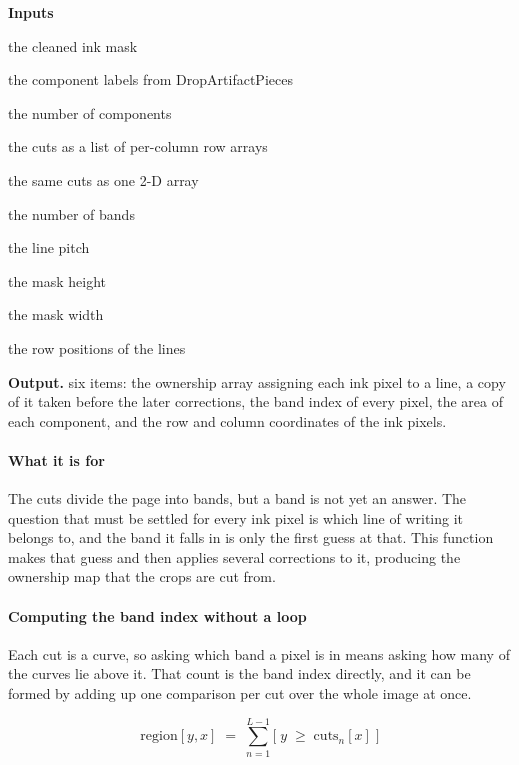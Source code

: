 \noindent\textbf{Inputs}
\begin{description}[leftmargin=2.2em,style=nextline,font=\normalfont\ttfamily]\setlength\itemsep{1pt}
  \item[{mask}] \normalfont the cleaned ink mask
  \item[{lab}] \normalfont the component labels from DropArtifactPieces
  \item[{nc}] \normalfont the number of components
  \item[{cuts}] \normalfont the cuts as a list of per-column row arrays
  \item[{cutsArr}] \normalfont the same cuts as one 2-D array
  \item[{L}] \normalfont the number of bands
  \item[{P}] \normalfont the line pitch
  \item[{H}] \normalfont the mask height
  \item[{W}] \normalfont the mask width
  \item[{centres}] \normalfont the row positions of the lines
\end{description}

\noindent\textbf{Output.} six items: the ownership array assigning each ink pixel to a line, a copy of it taken before the later corrections, the band index of every pixel, the area of each component, and the row and column coordinates of the ink pixels.


\paragraph{What it is for}
The cuts divide the page into bands, but a band is not yet an answer. The question that must be settled for every ink pixel is which line of writing it belongs to, and the band it falls in is only the first guess at that. This function makes that guess and then applies several corrections to it, producing the ownership map that the crops are cut from.


\paragraph{Computing the band index without a loop}
Each cut is a curve, so asking which band a pixel is in means asking how many of the curves lie above it. That count is the band index directly, and it can be formed by adding up one comparison per cut over the whole image at once.


\begin{equation}
\mathrm{region}[y,x] \;=\; \sum_{n=1}^{L-1} \big[\; y \;\ge\; \mathrm{cuts}_{n}[x] \;\big]
\end{equation}

